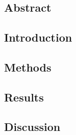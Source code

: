 \linespread{1.0}

\chapter{}
\section{Abstract}\label{sec:intro5}
\section{Introduction}
\section{Methods}
\section{Results}
\section{Discussion}


